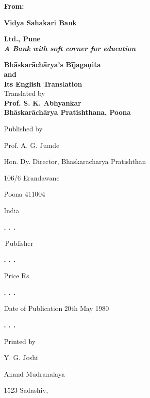 \documentclass[]{article}
\begin{document}
\textbf{From:}\\
\vspace{10pt}
\begin{center}
\textbf{\Huge	Vidya Sahakari Bank}\\
\vspace{20pt}
	
\textbf{\Huge	Ltd., Pune}\\
	\vspace{30pt}
\textbf{\textit{A Bank with soft corner for education}}\\
	
\end{center}
\newpage
\thispagestyle{empty}
\begin{center}
\textbf{\huge Bhāskarāchārya's Bījagaṇita}\\
	\vspace{10pt}
\textbf{\huge and}\\
	\vspace{10pt}
	\textbf{\huge Its English Translation}\\
	\vspace{180pt}
	Translated by\\
	\textbf{\large Prof. S. K. Abhyankar}\\
		\vspace{180pt}
	\textbf{\large Bhāskarāchārya Pratishthana, Poona}
\end{center}
\newpage
\thispagestyle{empty}
\large
{Published by}

{Prof. A. G. Jumde}

{Hon. Dy. Director, Bhaskaracharya Pratishthan}

{106/6 Erandawane}

{Poona 411004}

{India}

\textbf{\Huge . . .}

{\textcopyright \,Publisher}

\textbf{\Huge . . .}

{Price Rs.}

\textbf{\Huge . . .}

{Date of Publication 20th May 1980}

\textbf{\Huge . . .}

{Printed by }

{Y. G. Joshi}

{Anand Mudranalaya}

{1523 Sadashiv,}
\end{document}
